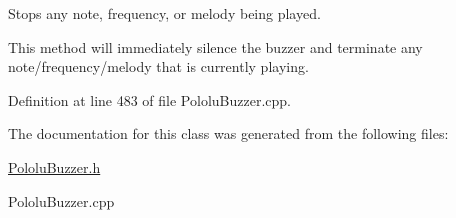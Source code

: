 Stops any note, frequency, or melody being played. 

This method will immediately silence the buzzer and terminate any note/frequency/melody that is currently playing. 

Definition at line 483 of file Pololu\+Buzzer.\+cpp.



The documentation for this class was generated from the following files\+:\begin{DoxyCompactItemize}
\item 
\hyperlink{_pololu_buzzer_8h}{Pololu\+Buzzer.\+h}\item 
Pololu\+Buzzer.\+cpp\end{DoxyCompactItemize}
